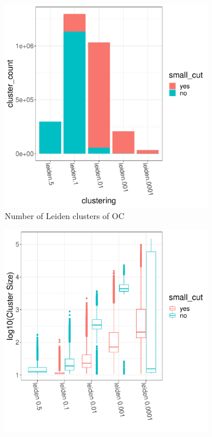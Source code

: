 \documentclass[11pt]{article}   	%
\begin{document}
\begin{figure}[H]
\centering
\begin{subfigure}[t]{0.45\textwidth}
\begin{center}
\includegraphics[width=0.9\linewidth]{figs/oc_istouched.pdf}
\caption{Number of Leiden clusters of OC}
\end{center}
\end{subfigure}
\begin{subfigure}[t]{0.45\textwidth}
\begin{center}
\includegraphics[width=0.9\linewidth]{figs/oc_boxplot.pdf}

\end{center}
\end{subfigure}
\end{figure}
\end{document}
